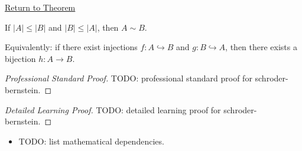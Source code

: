 \newpage
{}
\label{prf:schroder-bernstein}

\begin{remark*}[Return]
\hyperref[thm:schroder-bernstein]{Return to Theorem}
\end{remark*}

\begin{theorem*}
If $|A| \leq |B|$ and $|B| \leq |A|$, then $A \sim B$.

Equivalently: if there exist injections $f : A \hookrightarrow B$ and
$g : B \hookrightarrow A$, then there exists a bijection $h : A \to B$.
\end{theorem*}

\begin{proof}[Professional Standard Proof]
\LRAProofBodyStart
TODO: professional standard proof for schroder-bernstein.
\end{proof}

\begin{proof}[Detailed Learning Proof]
\LRAProofBodyStart
TODO: detailed learning proof for schroder-bernstein.
\end{proof}

\begin{remark*}
\end{remark*}

\begin{dependencies}
\begin{itemize}
  \item TODO: list mathematical dependencies.
\end{itemize}
\end{dependencies}

\clearpage
